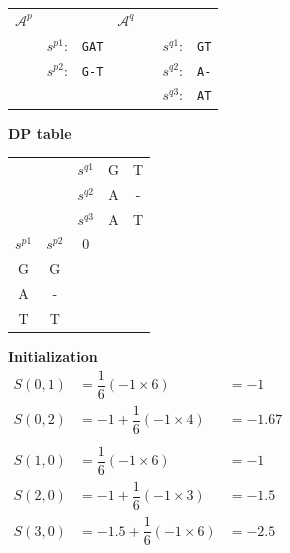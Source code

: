 \begin{table}[H]
\centering
\begin{tabular}{lllllll}
$\mathcal{A}^{p}$ & & \hspace{10em} & $\mathcal{A}^{q}$  & &  \\
 & $s^{p1}$: & \verb|GAT| &  &  & $s^{q1}$: & \verb|GT| \\
                        & $s^{p2}$: & \verb|G-T| &      &                         & $s^{q2}$: & \verb|A-| \\
                        &                          &     &      &                         & $s^{q3}$: & \verb|AT|
\end{tabular}
\end{table}

\textbf{DP table}

\begin{table}[H]
\centering
\begin{tabular}{ccccc}
  &                        & $s^{q1}$                           & G                     & T                     \\
  &                        & $s^{q2}$                           & A                     & -                     \\
  &                        & $s^{q3}$                          & A                     & T                     \\ \cline{3-5} 
$s^{p1}$ & \multicolumn{1}{c|}{$s^{p2}$} & \multicolumn{1}{c|}{0} & \multicolumn{1}{c|}{} & \multicolumn{1}{c|}{} \\ \cline{3-5} 
G & \multicolumn{1}{c|}{G} & \multicolumn{1}{c|}{}  & \multicolumn{1}{c|}{} & \multicolumn{1}{c|}{} \\ \cline{3-5} 
A & \multicolumn{1}{c|}{-} & \multicolumn{1}{c|}{}  & \multicolumn{1}{c|}{} & \multicolumn{1}{c|}{} \\ \cline{3-5} 
T & \multicolumn{1}{c|}{T} & \multicolumn{1}{c|}{}  & \multicolumn{1}{c|}{} & \multicolumn{1}{c|}{} \\ \cline{3-5} 
\end{tabular}
\end{table}

\textbf{Initialization} \\

$\begin{aligned}
S(0,1) &= \dfrac{1}{6}(-1 \times 6) &= -1 \\
S(0,2) &= -1 + \dfrac{1}{6}(-1 \times 4) &= -1.67 \\ \\
S(1,0) &= \dfrac{1}{6}(-1 \times 6) &= -1 \\
S(2,0) &= -1 + \dfrac{1}{6}(-1 \times 3) &= -1.5 \\
S(3,0) &= -1.5 + \dfrac{1}{6}(-1 \times 6) &= -2.5
\end{aligned} $
\bigskip \bigskip 

